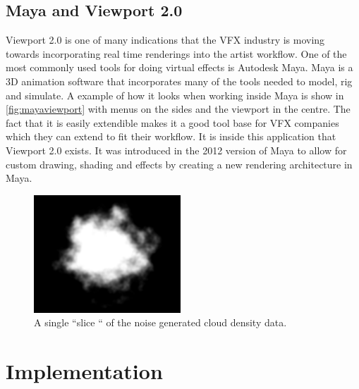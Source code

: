 \documentclass[11pt,twocolumn]{article}
\begin{document}
\subsection{Maya and Viewport 2.0}
Viewport 2.0 is one of many indications that the VFX industry is moving towards incorporating real time renderings into the artist workflow.
One of the most commonly used tools for doing virtual effects is Autodesk Maya.
Maya is a 3D animation software that incorporates many of the tools needed to model, rig and simulate.
A example of how it looks when working inside Maya is show in \autoref{fig:mayaviewport} with menus on the sides and the viewport in the centre.
The fact that it is easily extendible makes it a good tool base for VFX companies which they can extend to fit their workflow.
It is inside this application that Viewport 2.0 exists.
It was introduced in the 2012 version of Maya to allow for custom drawing, shading and effects by creating a new rendering architecture in Maya.

\begin{figure}[h]
\includegraphics[width=0.49\textwidth]{figures/cumulus_slice.png}
\caption{A single ``slice `` of the noise generated cloud density data.}
\label{fig:cloud_slice}
\end{figure}

\section{Implementation}
\end{document}
